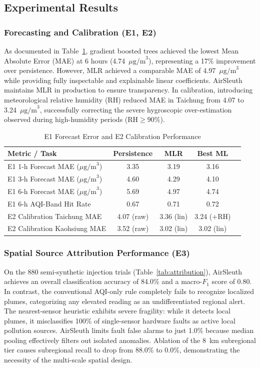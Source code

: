 \documentclass[conference]{IEEEtran}
\begin{document}
\subsection{Experimental Results}

\subsubsection{Forecasting and Calibration (E1, E2)}
As documented in Table~\ref{tab:results_forecast}, gradient boosted trees achieved the lowest Mean Absolute Error (MAE) at 6 hours (4.74~$\mu\text{g/m}^3$), representing a 17\% improvement over persistence. However, MLR achieved a comparable MAE of 4.97~$\mu\text{g/m}^3$ while providing fully inspectable and explainable linear coefficients. AirSleuth maintains MLR in production to ensure transparency. In calibration, introducing meteorological relative humidity ($\text{RH}$) reduced MAE in Taichung from 4.07 to 3.24~$\mu\text{g/m}^3$, successfully correcting the severe hygroscopic over-estimation observed during high-humidity periods ($\text{RH} \ge 90\%$).

\begin{table}[h]
\caption{E1 Forecast Error and E2 Calibration Performance}
\label{tab:results_forecast}
\centering
\begin{tabular}{lcccc}
\toprule
\textbf{Metric / Task} & \textbf{Persistence} & \textbf{MLR} & \textbf{Best ML} \\
\midrule
E1 1-h Forecast MAE ($\mu\text{g/m}^3$) & 3.35 & 3.19 & 3.16 \\
E1 3-h Forecast MAE ($\mu\text{g/m}^3$) & 4.60 & 4.29 & 4.10 \\
E1 6-h Forecast MAE ($\mu\text{g/m}^3$) & 5.69 & 4.97 & 4.74 \\
E1 6-h AQI-Band Hit Rate & 0.67 & 0.71 & 0.72 \\
\midrule
E2 Calibration Taichung MAE & 4.07 (raw) & 3.36 (lin) & 3.24 (+RH) \\
E2 Calibration Kaohsiung MAE & 3.52 (raw) & 3.02 (lin) & 3.02 (lin) \\
\bottomrule
\end{tabular}
\end{table}

\subsubsection{Spatial Source Attribution Performance (E3)}
On the 880 semi-synthetic injection trials (Table~\ref{tab:attribution}), AirSleuth achieves an overall classification accuracy of 84.0\% and a macro-$F_1$ score of 0.80. In contrast, the conventional AQI-only rule completely fails to recognize localized plumes, categorizing any elevated reading as an undifferentiated regional alert. The nearest-sensor heuristic exhibits severe fragility: while it detects local plumes, it misclassifies 100\% of single-sensor hardware faults as active local pollution sources. AirSleuth limits fault false alarms to just 1.0\% because median pooling effectively filters out isolated anomalies. Ablation of the 8~km subregional tier causes subregional recall to drop from 88.0\% to 0.0\%, demonstrating the necessity of the multi-scale spatial design.
\end{document}
